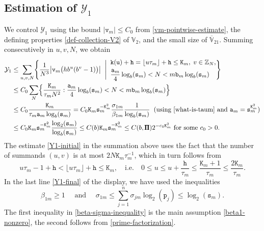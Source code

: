 \documentclass[12pt, twoside]{article}
\theoremstyle{definition}
\numberwithin{equation}{section}
\begin{document}
\subsection{Estimation of $\mathcal Y_1$}
We control $\mathcal Y_1$ using the bound $|\mathtt v_m| \leq C_0$ from \eqref{vm-pointwise-estimate}, the defining properties \eqref{def-collection-V2} of $\mathbb V_2$, and the small size of $\overline{\mathbb V}_{21}$. Summing consecutively in $u, v, N$, we obtain
\begin{align} 
\mathcal Y_1 &\leq \sum_{u, v, N} \Biggl\{\frac{1}{N^3}\bigl| \mathtt v_m \bigl(hb^u(b^v-1) \bigr) \bigr| \; \; \Biggl| \; \; \begin{aligned} &\mathtt k(\mathtt u) + \mathtt h = \lfloor u\tau_m \rfloor + \mathtt h \leq  \mathtt K_m, \; v\in \mathbb Z_N, \\  &\frac{\mathtt a_m}{4} \log_b (\mathtt s_m) < N < m\mathtt b_m \log_b (\mathtt s_m) \end{aligned} \Biggr\} \nonumber \\
&\leq C_0 \sum_{N} \Bigl\{\frac{\mathtt K_m}{\tau_m N^2} :  \frac{\mathtt a_m}{4} \log_b (\mathtt s_m) < N < m\mathtt b_m \log_b (\mathtt s_m) \Bigr\} \label{Y1-initial} \\ 
&\leq C_0 \frac{\mathtt K_m}{\tau_m \mathtt a_m \log_b (\mathtt s_m)}   = C_0 \mathtt K_m \mathtt s_m^{-\mathtt K_m^2} \frac{\sigma_{1m}}{\beta_{1m}} \frac{1}{\log_b (\mathtt s_m)} \; \; (\text{using \eqref{what-is-taum} and}\ \mathtt a_m=\mathtt s_m^{\mathtt K_m^2})\nonumber \\
&\leq C_0 \mathtt K_m \mathtt s_m^{-\mathtt K_m^2} \frac{\log_2 (\mathtt s_m)}{\log_b (\mathtt s_m)} \leq C(b) \mathtt K_m \mathtt s_m^{-\mathtt K_m^2} \leq C(b, \pmb{\Pi}) 2^{-c_0 \mathtt K_m^2} \text{ for some } c_0 > 0. \label{Y1-final}
\end{align}
The estimate \eqref{Y1-initial} in the summation above uses the fact that the number of summands $(u, v)$ is at most $2N \mathtt K_m \tau_m^{-1}$, which in turn follows from 
\[ u \tau_m - 1 + \mathtt h < \lfloor u \tau_m \rfloor + \mathtt h \leq \mathtt K_m, \quad \text{i.e.} \quad 0 \leq u \leq u + \frac{\mathtt h}{\tau_m} \leq \frac{\mathtt K_m+1}{\tau_m} \leq \frac{2\mathtt K_m}{\tau_m}. \] In the last line \eqref{Y1-final} of the display, we have used the inequalities 
\begin{equation} \label{beta-sigma-inequality} \beta_{1m} \geq 1 \quad \text{ and } \quad \sigma_{1m} \leq \sum_{j=1}^{n} \sigma_{jm} \log_2 (\mathtt p_j) \leq \log_2 (\mathtt s_m). \end{equation}
The first inequality in \eqref{beta-sigma-inequality} is the main assumption \eqref{beta1-nonzero}, the second follows from \eqref{prime-factorization}. 
\end{document}

